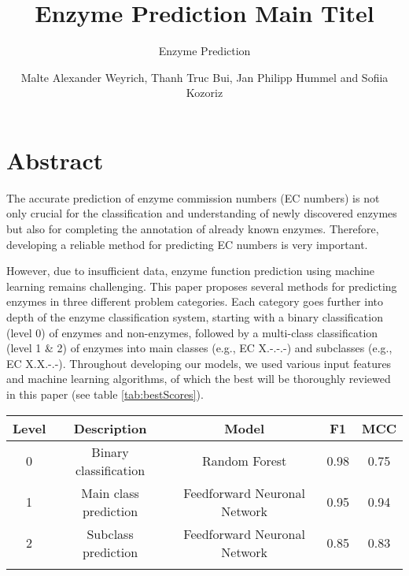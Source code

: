 \documentclass{bioinfo}
\begin{document}

\subtitle{Enzyme Prediction}

\title[]{Enzyme Prediction Main Titel}
\author[]{Malte Alexander Weyrich, Thanh Truc Bui, Jan Philipp Hummel
and  Sofiia Kozoriz}

\address{}
\corresp{}
\history{}
\editor{}

\abstract{}

\maketitle


\section{Abstract}
The accurate prediction of enzyme commission numbers (EC numbers) is not only crucial for 
the classification and understanding of newly discovered enzymes but also for completing the annotation of already known enzymes.
Therefore, developing a reliable method for predicting EC numbers is very important.

However, due to insufficient data, enzyme function prediction using machine learning remains challenging.
This paper proposes several methods for predicting enzymes in three different problem categories. Each category goes further into depth
of the enzyme classification system, starting with a binary classification (level 0) of enzymes and non-enzymes, followed by a multi-class classification (level 1 \& 2) of enzymes into main classes (e.g., EC X.-.-.-) and subclasses (e.g., EC X.X.-.-).
Throughout developing our models, we used various input features and machine learning algorithms, of which the best will be thoroughly reviewed in this paper (see table \ref{tab:bestScores}).

\begin{table}[!htbp]
 {\begin{tabular}{@{}ccccc@{}}\toprule 
		Level & Description & Model & F1 & MCC \\\midrule
		0 & Binary classification & Random Forest & 0.98 & 0.75 \\
		1 & Main class prediction &  Feedforward Neuronal Network & 0.95 & 0.94 \\
		2 & Subclass prediction&  Feedforward Neuronal Network & 0.85 & 0.83 \\\botrule
\end{tabular}}{}
\end{table}
\end{document}
